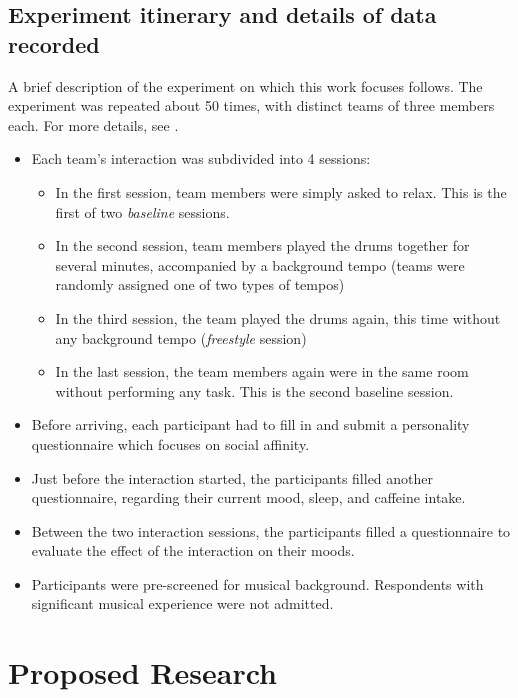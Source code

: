 \documentclass[a4paper, 11pt]{article}      %
\begin{document}
\subsection{Experiment itinerary and details of data recorded}
A brief description of the experiment on which this work focuses follows. The experiment was repeated about 50 times, with distinct teams of three members each. For more details, see \cite{gordon2020physio}.
\begin{itemize}
    \item Each team's interaction was subdivided into 4 sessions:
    \begin{itemize}
        \item In the first session, team members were simply asked to relax. This is the first of two \emph{baseline} sessions.
        \item In the second session, team members played the drums together for several minutes, accompanied by a background tempo (teams were randomly assigned one of two types of tempos)
        \item In the third session, the team played the drums again, this time without any background tempo (\emph{freestyle} session)
        \item In the last session, the team members again were in the same room without performing any task. This is the second baseline session.
    \end{itemize}
    \item Before arriving, each participant had to fill in and submit a personality questionnaire which focuses on social affinity.
    \item Just before the interaction started, the participants filled another questionnaire, regarding their current mood, sleep, and caffeine intake.
    \item Between the two interaction sessions, the participants filled a questionnaire to evaluate the effect of the interaction on their moods.
    \item Participants were pre-screened for musical  background. Respondents with significant musical experience were not admitted.
\end{itemize}



\section{Proposed Research}
\end{document}
